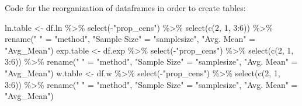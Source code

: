 \documentclass[12pt, twoside]{amherstthesis}
\newenvironment{Shaded}{\begin{snugshade}}{\end{snugshade}}
\newcommand{\DecValTok}[1]{\textcolor[rgb]{0.00,0.00,0.81}{#1}}
\newcommand{\FunctionTok}[1]{\textcolor[rgb]{0.00,0.00,0.00}{#1}}
\newcommand{\NormalTok}[1]{#1}
\newcommand{\OtherTok}[1]{\textcolor[rgb]{0.56,0.35,0.01}{#1}}
\newcommand{\SpecialCharTok}[1]{\textcolor[rgb]{0.00,0.00,0.00}{#1}}
\newcommand{\StringTok}[1]{\textcolor[rgb]{0.31,0.60,0.02}{#1}}
\begin{document}
Code for the reorganization of dataframes in order to create tables:
\begin{Shaded}
\begin{Highlighting}[]
\NormalTok{ln.table }\OtherTok{\textless{}{-}}\NormalTok{ df.ln }\SpecialCharTok{\%\textgreater{}\%}
  \FunctionTok{select}\NormalTok{(}\SpecialCharTok{{-}}\StringTok{"prop\_cens"}\NormalTok{) }\SpecialCharTok{\%\textgreater{}\%}
  \FunctionTok{select}\NormalTok{(}\FunctionTok{c}\NormalTok{(}\DecValTok{2}\NormalTok{, }\DecValTok{1}\NormalTok{, }\DecValTok{3}\SpecialCharTok{:}\DecValTok{6}\NormalTok{)) }\SpecialCharTok{\%\textgreater{}\%}
  \FunctionTok{rename}\NormalTok{(}\StringTok{" "} \OtherTok{=} \StringTok{"method"}\NormalTok{, }\StringTok{"Sample Size"} \OtherTok{=} \StringTok{"samplesize"}\NormalTok{, }
         \StringTok{"Avg. Mean"} \OtherTok{=} \StringTok{"Avg\_Mean"}\NormalTok{)}
\NormalTok{exp.table }\OtherTok{\textless{}{-}}\NormalTok{ df.exp }\SpecialCharTok{\%\textgreater{}\%}
  \FunctionTok{select}\NormalTok{(}\SpecialCharTok{{-}}\StringTok{"prop\_cens"}\NormalTok{) }\SpecialCharTok{\%\textgreater{}\%}
  \FunctionTok{select}\NormalTok{(}\FunctionTok{c}\NormalTok{(}\DecValTok{2}\NormalTok{, }\DecValTok{1}\NormalTok{, }\DecValTok{3}\SpecialCharTok{:}\DecValTok{6}\NormalTok{)) }\SpecialCharTok{\%\textgreater{}\%}
  \FunctionTok{rename}\NormalTok{(}\StringTok{" "} \OtherTok{=} \StringTok{"method"}\NormalTok{, }\StringTok{"Sample Size"} \OtherTok{=} \StringTok{"samplesize"}\NormalTok{, }
         \StringTok{"Avg. Mean"} \OtherTok{=} \StringTok{"Avg\_Mean"}\NormalTok{)}
\NormalTok{w.table }\OtherTok{\textless{}{-}}\NormalTok{ df.w }\SpecialCharTok{\%\textgreater{}\%}
  \FunctionTok{select}\NormalTok{(}\SpecialCharTok{{-}}\StringTok{"prop\_cens"}\NormalTok{) }\SpecialCharTok{\%\textgreater{}\%}
  \FunctionTok{select}\NormalTok{(}\FunctionTok{c}\NormalTok{(}\DecValTok{2}\NormalTok{, }\DecValTok{1}\NormalTok{, }\DecValTok{3}\SpecialCharTok{:}\DecValTok{6}\NormalTok{)) }\SpecialCharTok{\%\textgreater{}\%}
  \FunctionTok{rename}\NormalTok{(}\StringTok{" "} \OtherTok{=} \StringTok{"method"}\NormalTok{, }\StringTok{"Sample Size"} \OtherTok{=} \StringTok{"samplesize"}\NormalTok{, }
         \StringTok{"Avg. Mean"} \OtherTok{=} \StringTok{"Avg\_Mean"}\NormalTok{)}
\end{Highlighting}
\end{Shaded}
\end{document}
